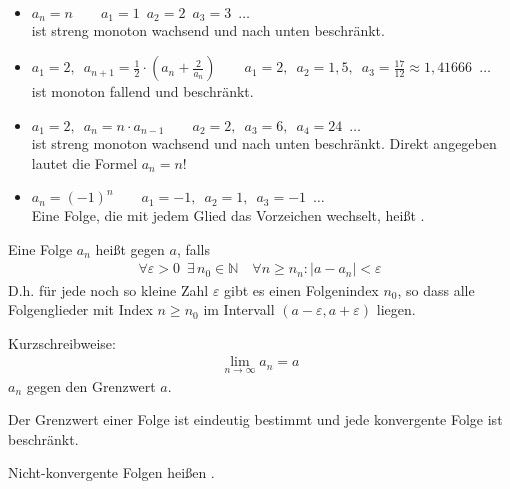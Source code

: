 \begin{itemize}
	\item{$a_n = n\qquad a_1 = 1\enspace a_2 = 2\enspace a_3 = 3\enspace\dots$\\ist streng monoton wachsend und nach unten beschränkt.}
	\item{$a_1 = 2,\enspace a_{n+1} = \frac{1}{2}\cdot\left(a_n + \frac{2}{a_n}\right)\qquad a_1 = 2,\enspace a_2 = 1,5,\enspace a_3 = \frac{17}{12} \approx 1,41666\enspace\dots$\\ist monoton fallend und beschränkt.}
	\item{$a_1 = 2,\enspace a_n = n\cdot a_{n-1}\qquad a_2 = 2,\enspace a_3 = 6,\enspace a_4 = 24\enspace\dots$\\ist streng monoton wachsend und nach unten beschränkt. Direkt angegeben lautet die Formel $a_n = n!$}
	\item{$a_n = (-1)^n\qquad a_1 = -1,\enspace a_2 = 1,\enspace a_3 = -1\enspace\dots$\\Eine Folge, die mit jedem Glied das Vorzeichen wechselt, heißt .}
\end{itemize}

Eine Folge $a_n$ heißt  gegen $a$, falls
\begin{align*}
	\forall \varepsilon > 0\enspace\exists\, n_0 \in \mathbb{N}\quad\forall n\geq n_n : |a - a_n| < \varepsilon
\end{align*}
D.h. für jede noch so kleine Zahl $\varepsilon$ gibt es einen Folgenindex $n_0$, so dass alle Folgenglieder mit Index $n \geq n_0$ im Intervall $(a-\varepsilon, a+\varepsilon)$ liegen.

Kurzschreibweise:
\begin{align*}
	\lim\limits_{n \to \infty}a_n = a
\end{align*}
$a_n$  gegen den Grenzwert $a$.

Der Grenzwert einer Folge ist eindeutig bestimmt und jede konvergente Folge ist beschränkt.

Nicht-konvergente Folgen heißen .

